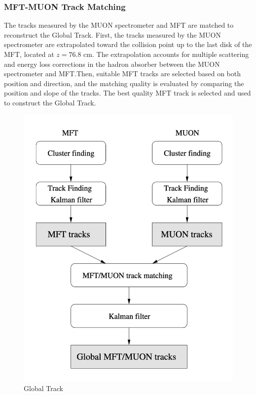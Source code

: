         \subsubsection{MFT-MUON Track Matching}\label{MFT-MUON_matching}
            The tracks measured by the MUON spectrometer and MFT are matched to reconstruct the Global Track. First, the tracks measured by the MUON spectrometer are extrapolated toward the collision point up to the last disk of the MFT, located at $z=76.8$ cm. The extrapolation accounts for multiple scattering and energy loss corrections in the hadron absorber between the MUON spectrometer and MFT.\@ Then, suitable MFT tracks are selected based on both position and direction, and the matching quality is evaluated by comparing the position and slope of the tracks. The best quality MFT track is selected and used to construct the Global Track.
            \begin{figure}[htbp]
                \centering
                \includegraphics[keepaspectratio, scale=0.3]{fig/2_2_3_GlobalTrackReco.png}
                \caption{Global Track\cite{MFT_TDR}}
                \label{GlobalTrackReco}
            \end{figure}